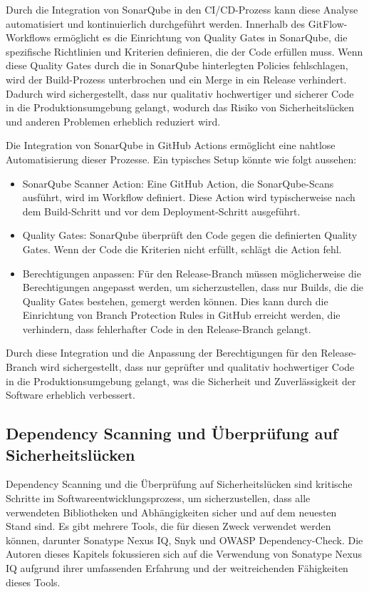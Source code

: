 \documentclass[conference,compsoc,final,a4paper]{IEEEtran}
\begin{document}
Durch die Integration von SonarQube in den CI/CD-Prozess kann diese Analyse automatisiert und kontinuierlich durchgeführt werden. Innerhalb des GitFlow-Workflows ermöglicht es die Einrichtung von Quality Gates in SonarQube, die spezifische Richtlinien und Kriterien definieren, die der Code erfüllen muss. Wenn diese Quality Gates durch die in SonarQube hinterlegten Policies fehlschlagen, wird der Build-Prozess unterbrochen und ein Merge in ein Release verhindert. Dadurch wird sichergestellt, dass nur qualitativ hochwertiger und sicherer Code in die Produktionsumgebung gelangt, wodurch das Risiko von Sicherheitslücken und anderen Problemen erheblich reduziert wird.

Die Integration von SonarQube in GitHub Actions ermöglicht eine nahtlose Automatisierung dieser Prozesse. Ein typisches Setup könnte wie folgt aussehen:

\begin{itemize}
\item SonarQube Scanner Action: Eine GitHub Action, die SonarQube-Scans ausführt, wird im Workflow definiert. Diese Action wird typischerweise nach dem Build-Schritt und vor dem Deployment-Schritt ausgeführt.
\item Quality Gates: SonarQube überprüft den Code gegen die definierten Quality Gates. Wenn der Code die Kriterien nicht erfüllt, schlägt die Action fehl.
\item Berechtigungen anpassen: Für den Release-Branch müssen möglicherweise die Berechtigungen angepasst werden, um sicherzustellen, dass nur Builds, die die Quality Gates bestehen, gemergt werden können. Dies kann durch die Einrichtung von Branch Protection Rules in GitHub erreicht werden, die verhindern, dass fehlerhafter Code in den Release-Branch gelangt.
\end{itemize}

Durch diese Integration und die Anpassung der Berechtigungen für den Release-Branch wird sichergestellt, dass nur geprüfter und qualitativ hochwertiger Code in die Produktionsumgebung gelangt, was die Sicherheit und Zuverlässigkeit der Software erheblich verbessert.


\subsection{Dependency Scanning und Überprüfung auf Sicherheitslücken}
Dependency Scanning und die Überprüfung auf Sicherheitslücken sind kritische Schritte im Softwareentwicklungsprozess, um sicherzustellen, dass alle verwendeten Bibliotheken und Abhängigkeiten sicher und auf dem neuesten Stand sind. Es gibt mehrere Tools, die für diesen Zweck verwendet werden können, darunter Sonatype Nexus IQ, Snyk und OWASP Dependency-Check. Die Autoren dieses Kapitels fokussieren sich auf die Verwendung von Sonatype Nexus IQ aufgrund ihrer umfassenden Erfahrung und der weitreichenden Fähigkeiten dieses Tools.
\end{document}
